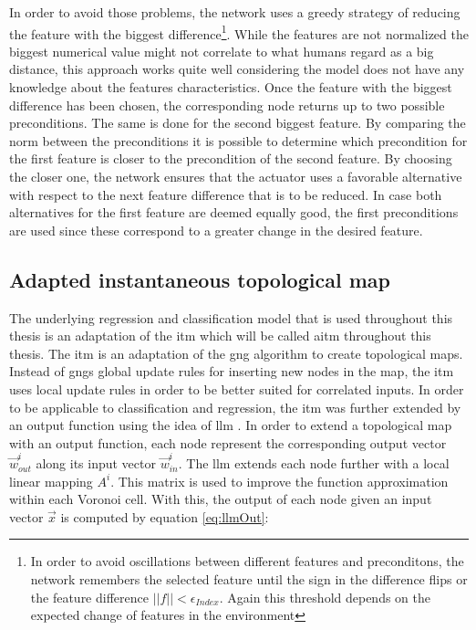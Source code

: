 In order to avoid those problems, the network uses a greedy strategy of reducing the feature with the biggest difference\footnote{In order to avoid oscillations between different features and preconditons, the network remembers the selected feature until the sign in the difference flips or the feature difference $||f|| < \epsilon_{Index}$. Again this threshold depends on the expected change of features in the environment}. While the features are not normalized the biggest numerical value might not correlate to what humans regard as a big distance, this approach works quite well considering the model does not have any knowledge about the features characteristics. 
Once the feature with the biggest difference has been chosen, the corresponding node returns up to two possible preconditions. The same is done for the second biggest feature. By comparing the norm between the preconditions it is possible to determine which precondition for the first feature is closer to the precondition of the second feature. By choosing the closer one, the network ensures that the actuator uses a favorable alternative with respect to the next feature difference that is to be reduced. 
In case both alternatives for the first feature are deemed equally good, the first preconditions are used since these correspond to a greater change in the desired feature.


\subsection{Adapted instantaneous topological map \label{sec:ITM}}
The underlying regression and classification model that is used throughout this thesis is an adaptation of the \acrfull{itm} which will be called \acrfull{aitm} throughout this thesis.
The \gls{itm} \cite{itm} is an adaptation of the \gls{gng} \cite{gng} algorithm to create topological maps. Instead of \glspl{gng} global update rules for inserting new nodes in the map, the \gls{itm} uses local update rules in order to be better suited for correlated inputs. 
In order to be applicable to classification and regression, the \gls{itm} was further extended by an output function using the idea of \gls{llm} \cite{LLM}. In order to extend a topological map with an output function, each node represent the corresponding output vector $\vec{w}^i_{out}$ along its input vector $\vec{w}^i_{in}$. The \gls{llm} extends each node further with a local linear mapping $A^i$. This matrix is used to improve the function approximation within each Voronoi cell. With this, the output of each node given an input vector $\vec{x}$ is computed by equation \ref{eq:llmOut}:

